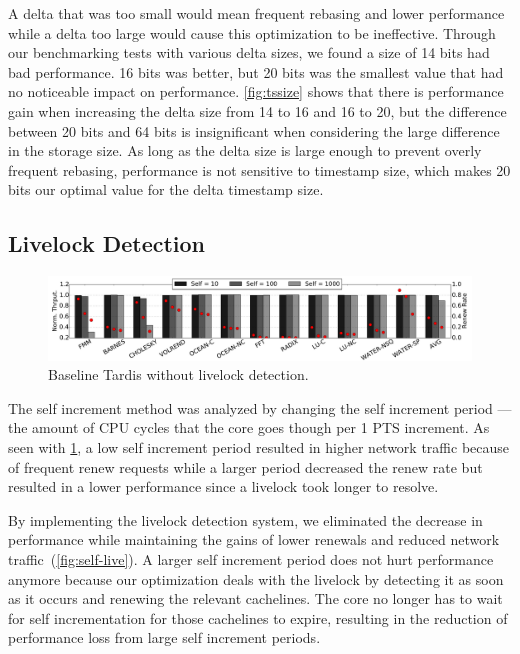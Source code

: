 \documentclass[12pt]{article}
\begin{document}
A delta that was too small would mean frequent rebasing and lower 
performance while a delta too large would cause this optimization to 
be ineffective. Through our benchmarking tests with various delta 
sizes, we found a size of 14 bits had bad performance. 16 bits was 
better, but 20 bits was the smallest 
value that had no noticeable impact on performance. \cref{fig:tssize} shows 
that  there is performance gain when increasing the delta 
size from 14 to 16 and 16 to 20, but the difference between 20 bits and 64 
bits is insignificant when considering the large difference in the 
storage size. As long as the delta size is large enough to prevent 
overly frequent rebasing, performance is not sensitive to timestamp 
size, which makes 20 bits our optimal value for the delta timestamp 
size.

\subsection{Livelock Detection}

\begin{figure}
	\centering
	\includegraphics[width=0.95\columnwidth]{figs/selfincr_nolive.pdf}
	\caption{ Baseline Tardis without livelock detection. }
	\label{fig:self-nolive}
\end{figure}

The self increment method was analyzed by changing the self increment 
period --- the amount of CPU cycles that the core goes though 
per 1 PTS increment. As seen with \cref{fig:self-nolive}, a low self 
increment period resulted in higher network traffic because of 
frequent renew requests while a larger period decreased the renew rate 
but resulted in a lower performance since a livelock took longer to 
resolve.  
  
  
By implementing the livelock detection system, we eliminated the 
decrease in performance while maintaining the gains of lower renewals 
and reduced network traffic~(\cref{fig:self-live}).  A larger self 
increment period does not hurt performance anymore because our 
optimization deals with the livelock  by detecting 
it as soon as it occurs and renewing the relevant cachelines. The core no longer has to 
wait for self incrementation for those cachelines to expire, resulting in the reduction of performance loss from large self increment 
periods.
\end{document}

